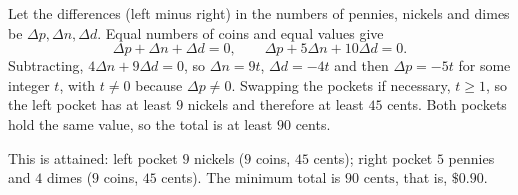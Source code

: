 Let the differences (left minus right) in the numbers of pennies, nickels and dimes be $\Delta p,\Delta n,\Delta d$. Equal numbers of coins and equal values give
\[
\Delta p+\Delta n+\Delta d=0,\qquad \Delta p+5\Delta n+10\Delta d=0 .
\]
Subtracting, $4\Delta n+9\Delta d=0$, so $\Delta n=9t$, $\Delta d=-4t$ and then $\Delta p=-5t$ for some integer $t$, with $t\ne0$ because $\Delta p\ne0$. Swapping the pockets if necessary, $t\ge1$, so the left pocket has at least $9$ nickels and therefore at least $45$ cents. Both pockets hold the same value, so the total is at least $90$ cents.

This is attained: left pocket $9$ nickels ($9$ coins, $45$ cents); right pocket $5$ pennies and $4$ dimes ($9$ coins, $45$ cents). The minimum total is $\boxed{90\text{ cents}}$, that is, $\$0.90$.
